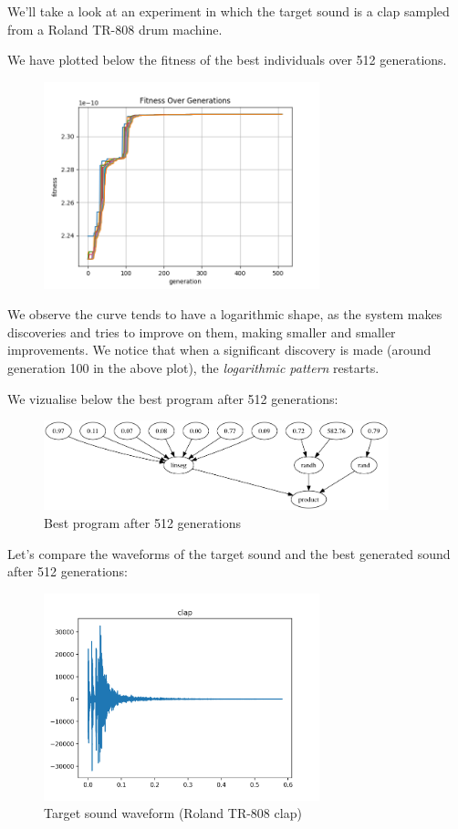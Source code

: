 \documentclass{article}
\begin{document}
We'll take a look at an experiment in which the target sound is a clap sampled from a Roland TR-808 drum machine.

We have plotted below the fitness of the best individuals over 512 generations.

\begin{figure}[H]
\includegraphics[width=8cm]{fitness_over_time}
\end{figure}

We observe the curve tends to have a logarithmic shape, as the system makes discoveries and tries to improve on them, making smaller and smaller improvements. We notice that when a significant discovery is made (around generation 100 in the above plot), the \textit{logarithmic pattern} restarts.

We vizualise below the best program after 512 generations:

\begin{figure}[H]
  \centering
  \includegraphics[width=10cm]{graph}
  \caption{Best program after 512 generations}
\end{figure}

Let's compare the waveforms of the target sound and the best generated sound after 512 generations:

\begin{figure}[H]
  \centering
  \includegraphics[width=8cm]{wav_clap_target}
  \caption{Target sound waveform (Roland TR-808 clap)}
\end{figure}
\end{document}
